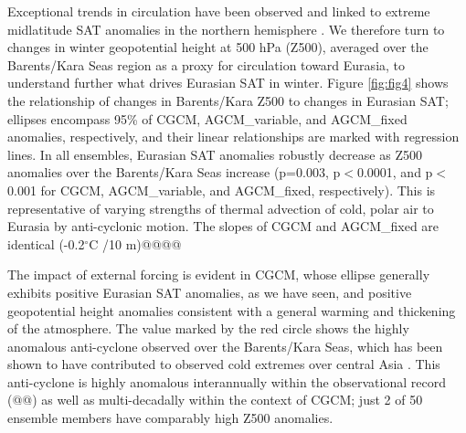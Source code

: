 \documentclass{nature}
\begin{document}

Exceptional trends in circulation have been observed and linked to extreme midlatitude SAT anomalies in the northern hemisphere \cite{horton15, sigmond15}. We therefore turn to changes in winter geopotential height at 500 hPa (Z500), averaged over the Barents/Kara Seas region as a proxy for circulation toward Eurasia, to understand further what drives Eurasian SAT in winter. Figure \ref{fig:fig4} shows the relationship of changes in Barents/Kara Z500 to changes in Eurasian SAT; ellipses encompass 95\% of CGCM, AGCM\_variable, and AGCM\_fixed anomalies, respectively, and their linear relationships are marked with regression lines. In all ensembles, Eurasian SAT anomalies robustly decrease as Z500 anomalies over the Barents/Kara Seas increase (p=0.003, p$<$0.0001, and p$<$0.001 for CGCM, AGCM\_variable, and AGCM\_fixed, respectively). This is representative of varying strengths of thermal advection of cold, polar air to Eurasia by anti-cyclonic motion. The slopes of CGCM and AGCM\_fixed are identical (-0.2$^\circ$C /10 m)@@@@

The impact of external forcing is evident in CGCM, whose ellipse generally exhibits positive Eurasian SAT anomalies, as we have seen, and positive geopotential height anomalies consistent with a general warming and thickening of the atmosphere. The value marked by the red circle shows the highly anomalous anti-cyclone observed over the Barents/Kara Seas, which has been shown to have contributed to observed cold extremes over central Asia \cite{horton15}. This anti-cyclone is highly anomalous interannually within the observational record (@@\cite{horton15}) as well as multi-decadally within the context of CGCM; just 2 of 50 ensemble members have comparably high Z500 anomalies.
\end{document}
